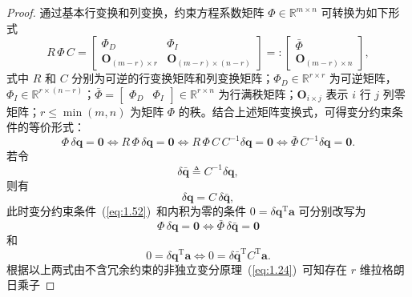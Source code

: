 \begin{proof}
通过基本行变换和列变换，约束方程系数矩阵 $\Phi \in \mathbb{R}^{m \times n}$ 可转换为如下形式
\begin{equation}\label{eq:1.51}
R\,\Phi\, C = \begin{bmatrix} \Phi_D & \Phi_I \\ \boldsymbol{O}_{(m-r) \times r} & \boldsymbol{O}_{(m-r) \times (n-r)} \end{bmatrix} =: \begin{bmatrix} \bar{\Phi} \\ \boldsymbol{O}_{(m-r) \times n} \end{bmatrix},
\end{equation}
式中 $R$ 和 $C$ 分别为可逆的行变换矩阵和列变换矩阵；$\Phi_D \in \mathbb{R}^{r \times r}$ 为可逆矩阵，$\Phi_I \in \mathbb{R}^{r \times (n-r)}$；$\bar{\Phi} = \begin{bmatrix} \Phi_D & \Phi_I \end{bmatrix} \in \mathbb{R}^{r \times n}$ 为行满秩矩阵；$\boldsymbol{O}_{i \times j}$ 表示 $i$ 行 $j$ 列零矩阵；$r \leq \min(m, n)$ 为矩阵 $\Phi$ 的秩。结合上述矩阵变换式，可得变分约束条件的等价形式：
\begin{equation}\label{eq:1.52}
\Phi\,\delta\boldsymbol{q} = \boldsymbol{0} \iff R\,\Phi\,\delta\boldsymbol{q} = \boldsymbol{0} \iff R\,\Phi\, C\, C^{-1} \delta\boldsymbol{q} = \boldsymbol{0} \iff \bar{\Phi}\, C^{-1} \delta\boldsymbol{q} = \boldsymbol{0}.
\end{equation}
若令
\begin{equation}\label{eq:1.53}
\delta\bar{\boldsymbol{q}} \triangleq C^{-1} \delta\boldsymbol{q},
\end{equation}
则有
\begin{equation}\label{eq:1.54}
\delta\boldsymbol{q} = C\,\delta\bar{\boldsymbol{q}},
\end{equation}
此时变分约束条件~(\ref{eq:1.52})~和内积为零的条件 $0 = \delta\boldsymbol{q}^{\mathrm{T}} \boldsymbol{a}$ 可分别改写为
\begin{equation}\label{eq:1.55}
\Phi\,\delta\boldsymbol{q} = \boldsymbol{0} \iff \bar{\Phi}\,\delta\bar{\boldsymbol{q}} = \boldsymbol{0}
\end{equation}
和
\begin{equation}\label{eq:1.56}
0 = \delta\boldsymbol{q}^{\mathrm{T}} \boldsymbol{a} \iff 0 = \delta\bar{\boldsymbol{q}}^{\mathrm{T}} C^{\mathrm{T}} \boldsymbol{a}.
\end{equation}
根据以上两式由不含冗余约束的非独立变分原理~(\ref{eq:1.24})~可知存在 $r$ 维拉格朗日乘子

\end{proof}
